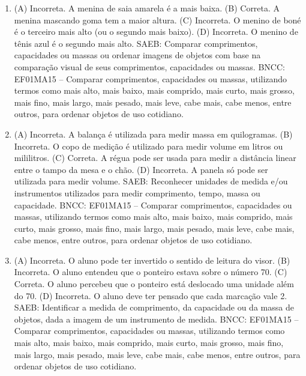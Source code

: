 
\begin{enumerate}
\item
(A) Incorreta. A menina de saia amarela é a mais baixa.
(B) Correta. A menina mascando goma tem a maior altura.
(C) Incorreta. O menino de boné é o terceiro mais alto (ou o segundo mais
baixo).
(D) Incorreta. O menino de tênis azul é o segundo mais alto.
SAEB: Comparar comprimentos, capacidades ou massas ou ordenar
imagens de objetos com base na comparação visual de seus comprimentos,
capacidades ou massas.
BNCC: EF01MA15 -- Comparar comprimentos, capacidades ou massas,
utilizando termos como mais alto, mais baixo, mais comprido, mais curto,
mais grosso, mais fino, mais largo, mais pesado, mais leve, cabe mais,
cabe menos, entre outros, para ordenar objetos de uso cotidiano.

\item
(A) Incorreta. A balança é utilizada para medir massa em quilogramas.
(B) Incorreta. O copo de medição é utilizado para medir volume em litros ou mililitros.
(C) Correta. A régua pode ser usada para medir a distância linear entre o tampo da mesa e o chão.
(D) Incorreta. A panela só pode ser utilizada para medir volume.
SAEB: Reconhecer unidades de medida e/ou instrumentos utilizados
para medir comprimento, tempo, massa ou capacidade.
BNCC: EF01MA15 -- Comparar comprimentos, capacidades ou massas,
utilizando termos como mais alto, mais baixo, mais comprido, mais curto,
mais grosso, mais fino, mais largo, mais pesado, mais leve, cabe mais,
cabe menos, entre outros, para ordenar objetos de uso cotidiano.

\item
(A) Incorreta. O aluno pode ter invertido o sentido de leitura do visor.
(B) Incorreta. O aluno entendeu que o ponteiro estava sobre o número 70.
(C) Correta. O aluno percebeu que o ponteiro está deslocado uma unidade
além do 70.
(D) Incorreta. O aluno deve ter pensado que cada marcação vale 2.
SAEB: Identificar a medida de comprimento, da capacidade ou da
massa de objetos, dada a imagem de um instrumento de medida.
BNCC: EF01MA15 -- Comparar comprimentos, capacidades ou massas,
utilizando termos como mais alto, mais baixo, mais comprido, mais curto,
mais grosso, mais fino, mais largo, mais pesado, mais leve, cabe mais,
cabe menos, entre outros, para ordenar objetos de uso cotidiano.
\end{enumerate}


